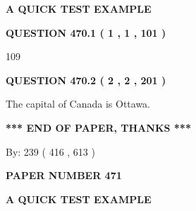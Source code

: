 \documentclass[12pt]{article}
\begin{document}
   
 \vspace{0.2in}
{\LARGE {\textbf{ A QUICK TEST EXAMPLE}}}
   
   
  
\vspace{0.2in}
  
{\textbf{\Large{QUESTION
470.1 
 ( 1 , 1 , 101 )
}}}
  
  
 
 
\noindent{}

109
 
 
  
\vspace{0.2in}
  
{\textbf{\Large{QUESTION
470.2 
 ( 2 , 2 , 201 )
}}}
  
  
 
 
\noindent{}
 
 
The capital of Canada is Ottawa.
 
 
 
 
   
   
 \vspace{0.2in}
 
   
   
   
   
\vspace{1.0in} 
{\textbf{\large{ *** END OF PAPER, THANKS *** }}} 
   
   
\hspace{1.0in} By: 
 239 ( 416 ,  613 )
   
   
   
   
\newpage 
\setcounter{page}{ 
   471001 } 
   
   
   
   
 {\textbf{ \Large{ PAPER NUMBER  471  }}}
   
   
\vspace{0.2in}
   
   
   
   
   
   
 \vspace{0.2in}
{\LARGE {\textbf{ A QUICK TEST EXAMPLE}}}
   
   
  
\vspace{0.2in}
  
\end{document}
